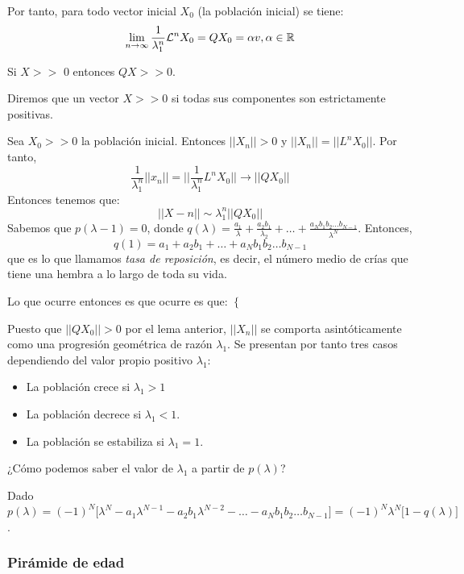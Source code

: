      Por tanto, para todo vector inicial $X_0$ (la población inicial) se tiene: $$\lim_{n\to\infty}\frac{1}{\lambda_1^n}\mathcal L^nX_0 = QX_0 = \alpha v, \alpha \in \mathbb{R}$$

     \begin{lema}
         Si $X >>$ 0 entonces $QX >> 0$.
     \end{lema}

     \begin{nota}
         Diremos que un vector $X >> 0$ si todas sus componentes son estrictamente positivas.
     \end{nota}

 Sea $X_0 >> 0$ la población inicial. Entonces $||X_n|| > 0$ y $||X_n|| = ||L^nX_0||$. Por tanto, $$\frac{1}{\lambda_1^n}||x_n|| = ||\frac{1}{\lambda_1^n}L^nX_0|| \rightarrow ||QX_0||$$ Entonces tenemos que: $$||X-n|| \sim \lambda_1^n ||QX_0||$$
 Sabemos que $p(\lambda-1) = 0$, donde $q(\lambda) = \frac{a_1}{\lambda} + \frac{a_2b_1}{\lambda_2}+ \hdots + \frac{a_Nb_1b_2\hdots b_{N-1}}{\lambda^N}$. Entonces, $$q(1) = a_1 + a_2b_1 + \hdots + a_Nb_1b_2\hdots b_{N-1}$$ que es lo que llamamos \textit{tasa de reposición}, es decir, el número medio de crías que tiene una hembra a lo largo de toda su vida.

 Lo que ocurre entonces es que ocurre es que: $\begin{cases}

 \end{cases}$

 Puesto que $||QX_0|| > 0$ por el lema anterior, $||X_n||$ se comporta asintóticamente como una progresión geométrica de razón $\lambda_1$. Se presentan por tanto tres casos dependiendo del valor propio positivo $\lambda_1$: \begin{itemize}
        \item La población crece si $\lambda_1 > 1$
        \item La población decrece si $\lambda_1 < 1$.
        \item La población se estabiliza si $\lambda_1 = 1$.
 \end{itemize}

 ¿Cómo podemos saber el valor de $\lambda_1$ a partir de $p(\lambda)$?

 Dado $p(\lambda) = (-1)^N\big[\lambda^N-a_1\lambda^{N-1}-a_2b_1\lambda^{N-2} - \hdots - a_Nb_1b_2\hdots b_{N-1}\big] = (-1)^N\lambda^N\big[1 - q(\lambda)\big]$.

 \subsubsection{Pirámide de edad}
 \label{ssub:pir_mide_de_edad}

